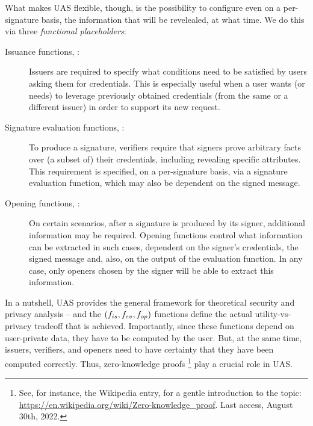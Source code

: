 What makes UAS flexible, though, is the possibility to configure even on a
per-signature basis, the information that will be revelealed, at what time. We
do this via three \emph{functional placeholders}:

\begin{description}
\item[Issuance functions, \fissue:] Issuers are required to specify what
  conditions need to be satisfied by users asking them for credentials. This is
  especially useful when a user wants (or needs) to leverage previously obtained
  credentials (from the same or a different issuer) in order to support its new
  request.
\item[Signature evaluation functions, \feval:] To produce a signature, verifiers
  require that signers prove arbitrary facts over (a subset of) their
  credentials, including revealing specific attributes. This requirement is
  specified, on a per-signature basis, via a signature evaluation function,
  which may also be dependent on the signed message.
\item[Opening functions, \finsp:] On certain scenarios, after a signature is
  produced by its signer, additional information may be required. Opening
  functions control what information can be extracted in such cases, dependent
  on the signer's credentials, the signed message and, also, on the output of
  the evaluation function. In any case, only openers chosen by the signer will
  be able to extract this information.
\end{description}

In a nutshell, UAS provides the general framework for theoretical security and
privacy analysis -- and the $(f_{is},f_{ev},f_{op})$ functions define the
actual utility-vs-privacy tradeoff that is achieved. Importantly, since these
functions depend on user-private data, they have to be computed by the user.
But, at the same time, issuers, verifiers, and openers need to have certainty
that they have been computed correctly. Thus, zero-knowledge proofs%
\footnote{See, for instance, the Wikipedia entry, for a gentle introduction to
  the topic: \url{https://en.wikipedia.org/wiki/Zero-knowledge_proof}. Last
  access, August 30th, 2022.} play a crucial role in UAS.

